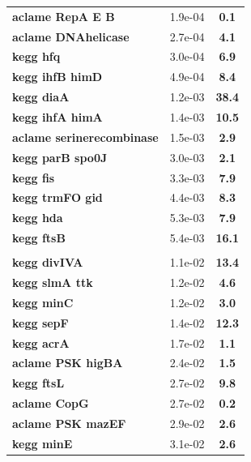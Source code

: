 \begin{landscape}
\begin{table}
{\begin{minipage}[t]{0.3\textwidth}
\begin{tabular}{>{\bfseries}p{\textwidth}cc}
\rowcolor{posit}aclame RepA E B&1.9e-04&\textbf{\colorbox{colorpowernegxx}{0.1}}\\
\rowcolor{posit}aclame DNAhelicase&2.7e-04&\textbf{\colorbox{colorpowerx}{4.1}}\\
\rowcolor{posit}kegg hfq&3.0e-04&\textbf{\colorbox{colorpowerx}{6.9}}\\
\rowcolor{posit}kegg ihfB himD&4.9e-04&\textbf{\colorbox{colorpowerxx}{8.4}}\\
\rowcolor{posit}kegg diaA&1.2e-03&\textbf{\colorbox{colorpowerxxx}{38.4}}\\
\rowcolor{posit}kegg ihfA himA&1.4e-03&\textbf{\colorbox{colorpowerxx}{10.5}}\\
\rowcolor{posit}aclame serinerecombinase&1.5e-03&\textbf{\colorbox{colorpowerx}{2.9}}\\
\rowcolor{posit}kegg parB spo0J&3.0e-03&\textbf{\colorbox{colorpower}{2.1}}\\
\rowcolor{posit}kegg fis&3.3e-03&\textbf{\colorbox{colorpowerxx}{7.9}}\\
\rowcolor{posit}kegg trmFO gid&4.4e-03&\textbf{\colorbox{colorpowerxx}{8.3}}\\
\rowcolor{posit}kegg hda&5.3e-03&\textbf{\colorbox{colorpowerxx}{7.9}}\\
\rowcolor{posit}kegg ftsB&5.4e-03&\textbf{\colorbox{colorpowerxx}{16.1}}\\
\\
\rowcolor{posit2}kegg divIVA&1.1e-02&\textbf{\colorbox{colorpowerxx}{13.4}}\\
\rowcolor{posit2}kegg slmA ttk&1.2e-02&\textbf{\colorbox{colorpowerx}{4.6}}\\
\rowcolor{posit2}kegg minC&1.2e-02&\textbf{\colorbox{colorpowerx}{3.0}}\\
\rowcolor{posit2}kegg sepF&1.4e-02&\textbf{\colorbox{colorpowerxx}{12.3}}\\
\rowcolor{posit2}kegg acrA&1.7e-02&\textbf{\colorbox{colorpower}{1.1}}\\
\rowcolor{posit2}aclame PSK higBA&2.4e-02&\textbf{\colorbox{colorpower}{1.5}}\\
\rowcolor{posit2}kegg ftsL&2.7e-02&\textbf{\colorbox{colorpowerxx}{9.8}}\\
\rowcolor{posit2}aclame CopG&2.7e-02&\textbf{\colorbox{colorpowernegx}{0.2}}\\
\rowcolor{posit2}aclame PSK mazEF&2.9e-02&\textbf{\colorbox{colorpower}{2.6}}\\
\rowcolor{posit2}kegg minE&3.1e-02&\textbf{\colorbox{colorpower}{2.6}}\\

\end{tabular}
\end{minipage}}
\end{table}
\end{landscape}
